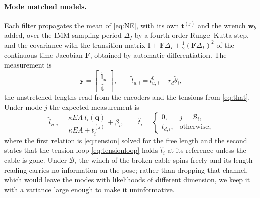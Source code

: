 \documentclass[10pt]{article}
\newcommand{\vc}[1]{\bm{#1}}
\newcommand{\mt}[1]{\mathbf{#1}}
\newcommand{\eye}{\mt{I}}
\begin{document}
\paragraph{Mode matched models.} Each filter propagates the mean of \eqref{eq:NE}, with its own $\vc t^{(j)}$ and the wrench $\vc w_b$ added, over the IMM sampling period $\Delta_I$ by a fourth order Runge--Kutta step, and the covariance with the transition matrix $\eye+\mt F\Delta_I+\tfrac12(\mt F\Delta_I)^2$ of the continuous time Jacobian $\mt F$, obtained by automatic differentiation. The measurement is
\begin{equation}\label{eq:meas}
\vc y=\begin{bmatrix}\tilde{\vc l}_u\\ \hat{\vc t}\end{bmatrix},\qquad \tilde l_{u,i}=l_{u,i}^0-r_d\tilde\theta_i ,
\end{equation}
the unstretched lengths read from the encoders and the tensions from \eqref{eq:that}. Under mode $j$ the expected measurement is
\begin{equation}\label{eq:h}
\tilde l_{u,i}=\frac{\kappa EA\;l_i(\vc q)}{\kappa EA+t_i^{(j)}}+\beta_i,\qquad
\hat t_i=\begin{cases}0,& j=\mathcal B_i,\\ t_{d,i},&\text{otherwise,}\end{cases}
\end{equation}
where the first relation is \eqref{eq:tension} solved for the free length and the second states that the tension loop \eqref{eq:tensionloop} holds $\hat t_i$ at its reference unless the cable is gone. Under $\mathcal B_i$ the winch of the broken cable spins freely and its length reading carries no information on the pose; rather than dropping that channel, which would leave the modes with likelihoods of different dimension, we keep it with a variance large enough to make it uninformative.
\end{document}

